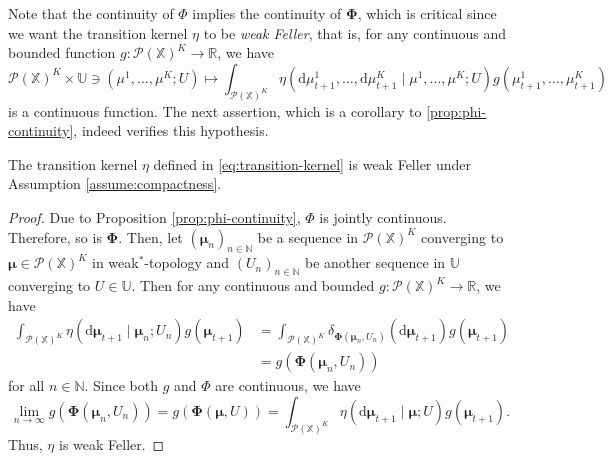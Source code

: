 \documentclass[11pt]{article}
\newcommand{\RR}{\mathbb{R}}
\newcommand{\NN}{\mathbb{N}}
\newcommand{\XX}{\mathbb{X}}
\newcommand{\UU}{\mathbb{U}}
\newcommand{\cP}{\mathcal{P}}
\newcommand{\de}{\mathrm{d}} %
\begin{document}
Note that the continuity of $\Phi$ implies the continuity of $\bm{\Phi}$, which is critical since we want the transition kernel $\eta$ to be \emph{weak Feller}, that is, for any continuous and bounded function $g:\cP(\XX)^K\to\RR$, we have
\begin{equation}\label{eq:weak-feller}
    \cP(\XX)^K\times\UU\ni(\mu^1,\ldots,\mu^K; U)\mapsto\int_{\cP(\XX)^K}\eta(\de\mu_{t+1}^1,\ldots,\de\mu_{t+1}^K \mid \mu^1,\ldots,\mu^K; U)g(\mu_{t+1}^1,\ldots,\mu_{t+1}^K)
\end{equation}
is a continuous function. The next assertion, which is a corollary to \ref{prop:phi-continuity}, indeed verifies this hypothesis.
\begin{corollary}\label{cor:transition-kernel}
    The transition kernel $\eta$ defined in \eqref{eq:transition-kernel} is weak Feller under Assumption \ref{assume:compactness}.
\end{corollary}
\begin{proof}
    Due to Proposition \ref{prop:phi-continuity}, $\Phi$ is jointly continuous. Therefore, so is $\bm{\Phi}$. Then, let $(\bm{\mu}_n)_{n\in\NN}$ be a sequence in $\cP(\XX)^K$ converging to $\bm{\mu}\in\cP(\XX)^K$ in weak$^*$-topology and $(U_n)_{n\in\NN}$ be another sequence in $\UU$ converging to $U\in\UU$. Then for any continuous and bounded $g:\cP(\XX)^K\to\RR$, we have
    \begin{align*}
        \int_{\cP(\XX)^K} \eta(\de\bm{\mu}_{t+1}\mid \bm{\mu}_n; U_n)g(\bm{\mu}_{t+1}) &= \int_{\cP(\XX)^K}\delta_{\bm{\Phi}(\bm{\mu}_n, U_n)}(\de\bm{\mu}_{t+1})g(\bm{\mu}_{t+1}) \\
        &= g(\bm{\Phi}(\bm{\mu}_n, U_n))
    \end{align*}
    for all $n\in\NN$. Since both $g$ and $\Phi$ are continuous, we have
    \begin{equation*}
        \lim_{n\to\infty}g(\bm{\Phi}(\bm{\mu}_n, U_n)) = g(\bm{\Phi}(\bm{\mu}, U)) = \int_{\cP(\XX)^K} \eta(\de\bm{\mu}_{t+1}\mid \bm{\mu}; U)g(\bm{\mu}_{t+1}).
    \end{equation*}
    Thus, $\eta$ is weak Feller.
\end{proof}
\end{document}
